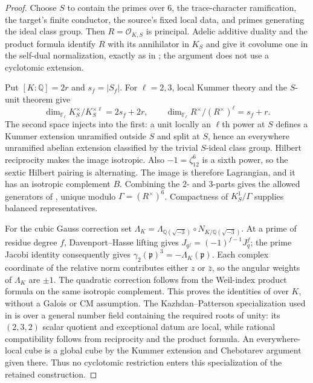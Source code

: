 \documentclass[11pt,a4paper]{article}
\theoremstyle{remark}\newtheorem{remark}[theorem]{Remark}
\numberwithin{equation}{section}
\begin{document}
\begin{proof}
Choose $S$ to contain the primes over $6$, the trace-character
ramification, the target's finite conductor, the source's fixed local
data, and primes generating the ideal class group.  Then
$R=\mathcal O_{K,S}$ is principal.  Adelic additive duality and the
product formula identify $R$ with its annihilator in $K_S$ and give
it covolume one in the self-dual normalization, exactly as in
\cite[Lemma 3.1]{P}; the argument does not use a cyclotomic extension.

Put $[K:\mathbb Q]=2r$ and $s_f=|S_f|$.  For $\ell=2,3$, local
Kummer theory and the $S$-unit theorem give
\[
 \dim_{\mathbb F_\ell}K_S^\times/K_S^{\times\ell}=2s_f+2r,
 \qquad
 \dim_{\mathbb F_\ell}R^\times/(R^\times)^\ell=s_f+r.
\]
The second space injects into the first: a unit locally an
$\ell$th power at $S$ defines a Kummer extension unramified outside
$S$ and split at $S$, hence an everywhere unramified abelian extension
classified by the trivial $S$-ideal class group.  Hilbert reciprocity
makes the image isotropic.  Also $-1=\zeta_{12}^6$ is a sixth power,
so the sextic Hilbert pairing is alternating.  The image is therefore
Lagrangian, and it has an isotropic complement $B$.  Combining the
$2$- and $3$-parts gives the allowed generators of
\cite[Lemma 3.2]{P}, unique modulo $\Gamma=(R^\times)^6$.
Compactness of $K_S^1/\Gamma$ supplies balanced representatives.

For the cubic Gauss correction set
$\Lambda_K=\Lambda_{\mathbb Q(\sqrt{-3})}\circ N_{K/\mathbb Q(\sqrt{-3})}$.
At a prime of residue degree $f$, Davenport--Hasse lifting gives
$J_{q^f}=(-1)^{f-1}J_q^f$; the prime Jacobi identity consequently gives
$\gamma_2(\mathfrak p)^3=-\Lambda_K(\mathfrak p)$.
Each complex coordinate of the relative norm contributes either $z$
or $\bar z$, so the angular weights of $\Lambda_K$ are $\pm1$.
The quadratic correction follows from the Weil-index product formula
on the same isotropic complement.  This proves the identities of
\cite[Lemma 3.4]{P} over $K$, without a Galois or CM assumption.
The Kazhdan--Patterson specialization used in \cite[Appendix A]{P}
is over a general number field containing the required roots of unity:
its $(2,3,2)$ scalar quotient and exceptional datum are local, while
rational compatibility follows from reciprocity and the product
formula.  An everywhere-local cube is a global cube by the Kummer
extension and Chebotarev argument given there.  Thus no cyclotomic
restriction enters this specialization of the retained construction.


\end{proof}
\end{document}
